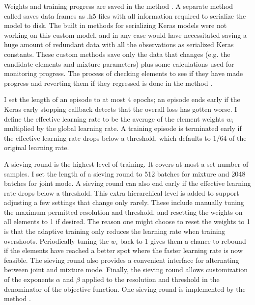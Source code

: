 Weights and training progress are saved in the method .
A separate method called  saves data frames as .h5 files with all information required to serialize the model to disk.
The built in methods for serializing Keras models were not working on this custom model, 
and in any case would have necessitated saving a huge amount of redundant data with all the observations as serialized Keras constants.
These custom methods save only the data that changes (e.g. the candidate elements and mixture parameters) plus some calculations used for monitoring progress.
The process of checking elements to see if they have made progress and reverting them if they regressed 
is done in the method .

I set the length of an episode to at most 4 epochs; an episode ends early if the Keras early stopping callback detects that the overall loss has gotten worse.
I define the effective learning rate to be the average of the element weights $w_i$ multiplied by the global learning rate.
A training episode is terminated early if the effective learning rate drops below a threshold, which defaults to $1/64$ of the original learning rate.

A sieving round is the highest level of training.
It covers at most a set number of samples.
I set the length of a sieving round to 512 batches for mixture and 2048 batches for joint mode.
A sieving round can also end early if the effective learning rate drops below a threshold.
This extra hierarchical level is added to support adjusting a few settings that change only rarely.
These include manually tuning the maximum permitted resolution and threshold, and resetting the weights on all elements to 1 if desired.
The reason one might choose to reset the weights to 1 is that the adaptive training only reduces the learning rate when training overshoots.
Periodically tuning the $w_i$ back to 1 gives them a chance to rebound if the elements have reached a better spot where the faster
learning rate is now feasible.
The sieving round also provides a convenient interface for alternating between joint and mixture mode.
Finally, the sieving round allows customization of the exponents $\alpha$ and $\beta$ applied to the resolution and threshold 
in the denominator of the objective function.
One sieving round is implemented by the method .

